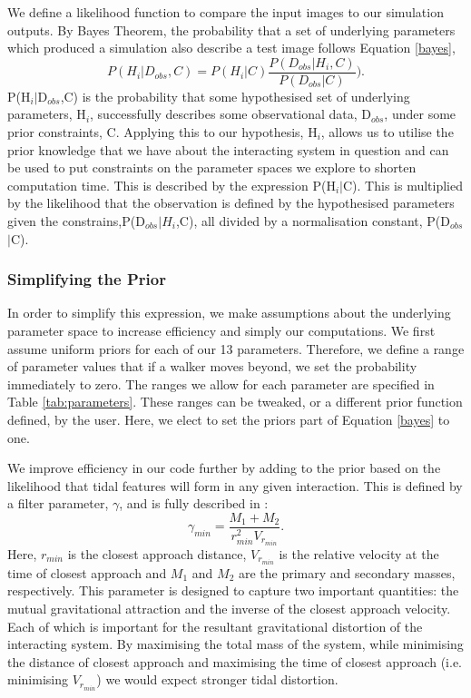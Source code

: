We define a likelihood function to compare the input images to our simulation outputs. By Bayes Theorem, the probability that a set of underlying parameters which produced a simulation also describe a test image follows Equation \ref{bayes},
\begin{equation}\label{bayes}
P(H_{i}|D_{obs},C) = P(H_{i}|C)\frac{P(D_{obs}|H_{i},C)}{P(D_{obs}|C)}).
\end{equation}
P(H$_{i}$$|$D$_{obs}$,C) is the probability that some hypothesised set of underlying parameters, H$_{i}$, successfully describes some observational data, D$_{obs}$, under some prior constraints, C. Applying this to our hypothesis, H$_{i}$, allows us to utilise the prior knowledge that we have about the interacting system in question and can be used to put constraints on the parameter spaces we explore to shorten computation time. This is described by the expression P(H$_{i}$$|$C). This is multiplied by the likelihood that the observation is defined by the hypothesised parameters given the constrains,P(D$_{obs}$$|$$H_{i}$,C), all divided by a normalisation constant, P(D$_{obs}$$|$C).

\subsubsection{Simplifying the Prior}
In order to simplify this expression, we make assumptions about the underlying parameter space to increase efficiency and simply our computations. We first assume uniform priors for each of our 13 parameters. Therefore, we define a range of parameter values that if a walker moves beyond, we set the probability immediately to zero. The ranges we allow for each parameter are specified in Table \ref{tab:parameters}. These ranges can be tweaked, or a different prior function defined, by the user. Here, we elect to set the priors part of Equation \ref{bayes} to one.

We improve efficiency in our code further by adding to the prior based on the likelihood that tidal features will form in any given interaction. This is defined by a filter parameter, $\gamma$, and is fully described in \citet[][where it is called $\beta$ but we call it $\gamma$ here to not be confused with our star formation enhancement parameter of Equation \ref{enhancement_param}]{2016MNRAS.459..720H}:
\begin{equation}\label{gamma_param}
\gamma_{min} = \frac{M_{1} + M_{2}}{r_{min}^{2}V_{r_{min}}}.
\end{equation}
Here, $r_{min}$ is the closest approach distance, $V_{r_{min}}$ is the relative velocity at the time of closest approach and $M_{1}$ and $M_{2}$ are the primary and secondary masses, respectively. This parameter is designed to capture two important quantities: the mutual gravitational attraction and the inverse of the closest approach velocity. Each of which is important for the resultant gravitational distortion of the interacting system. By maximising the total mass of the system, while minimising the distance of closest approach and maximising the time of closest approach (i.e. minimising $V_{r_{min}}$) we would expect stronger tidal distortion. 


